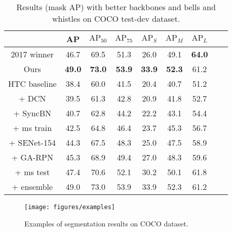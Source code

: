 \documentclass[10pt,twocolumn,letterpaper]{article}
\begin{document}
\begin{table}[htb]
	\centering
	\caption{Results (mask AP) with better backbones and bells and whistles on COCO test-dev dataset.}
	\addtolength{\tabcolsep}{-2pt}
	\begin{tabular}{*{9}{c}}
		\toprule
		                              & AP            & $\text{AP}_{50}$ & $\text{AP}_{75}$ & $\text{AP}_{S}$ & $\text{AP}_{M}$ & $\text{AP}_{L}$ \\
		\midrule
		2017 winner \cite{liu2018path} & 46.7          & 69.5             & 51.3             & 26.0            & 49.1            & \textbf{64.0}   \\
		Ours                          & \textbf{49.0} & \textbf{73.0}    & \textbf{53.9}    & \textbf{33.9}   & \textbf{52.3}   & 61.2            \\
		\midrule
		HTC baseline                  & 38.4          & 60.0             & 41.5             & 20.4            & 40.7            & 51.2            \\
		+ DCN                         & 39.5          & 61.3             & 42.8             & 20.9            & 41.8            & 52.7            \\
		+ SyncBN                      & 40.7          & 62.8             & 44.2             & 22.2            & 43.1            & 54.4            \\
		+ ms train                    & 42.5          & 64.8             & 46.4             & 23.7            & 45.3            & 56.7            \\
		+ SENet-154                   & 44.3          & 67.5             & 48.3             & 25.0            & 47.5            & 58.9            \\
		+ GA-RPN                      & 45.3          & 68.9             & 49.4             & 27.0            & 48.3            & 59.6            \\
		+ ms test                     & 47.4          & 70.6             & 52.1             & 30.2            & 50.1            & 61.8            \\
		+ ensemble                    & 49.0          & 73.0             & 53.9             & 33.9            & 52.3            & 61.2            \\
		\bottomrule
	\end{tabular}
	\vspace{-0.3cm}
	\label{tab:challenge-results}
\end{table}

\begin{figure*}
	\centering
	\texttt{[image: figures/examples]}
	\caption{Examples of segmentation results on COCO dataset.}
	\vspace{-0.3cm}
	\label{fig:examples}
\end{figure*}
\end{document}
